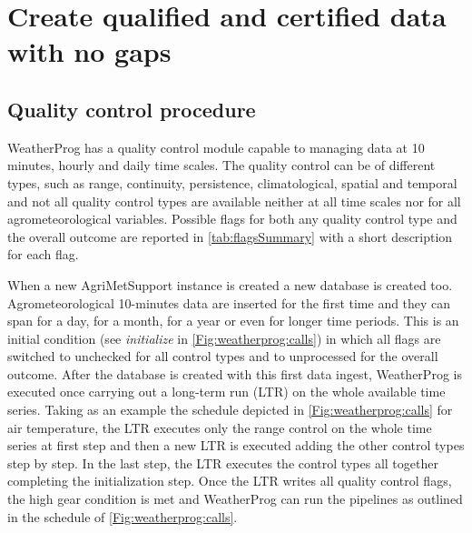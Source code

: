 \documentclass[authoryear,preprint,review,12pt]{elsarticle}
\newcommand{\note}[1]{\emph{\textcolor{red}{#1}}}
\begin{document}
\section{Create qualified and certified data with no gaps} \label{sec:qck+fill}

\subsection{Quality control procedure} \label{sec:qcheck}
WeatherProg has a quality control module capable to managing data at 10 minutes, hourly and daily time scales.
The quality control can be of different types, such as range, continuity, persistence, climatological, spatial and temporal and not all quality control types are available neither at all time scales nor for all agrometeorological variables.
Possible flags for both any quality control type and the overall outcome are reported in \cref{tab:flagsSummary} with a short description for each flag.

When a new AgriMetSupport instance is created a new database is created too.
Agrometeorological 10-minutes data are inserted for the first time and they can span for a day, for a month, for a year or even for longer time periods.
This is an initial condition (see \textit{initialize} in \cref{Fig:weatherprog:calls}) in which all flags are switched to unchecked for all control types and to unprocessed for the overall outcome.
After the database is created with this first data ingest, WeatherProg is executed once carrying out a long-term run (LTR) on the whole available time series.
Taking as an example the schedule depicted in \cref{Fig:weatherprog:calls} for air temperature, the LTR executes only the range control on the whole time series at first step and then a new LTR is executed adding the other control types step by step.
In the last step, the LTR executes the control types all together completing the initialization step.
Once the LTR writes all quality control flags, the high gear condition is met and WeatherProg can run the pipelines as outlined in the schedule of \cref{Fig:weatherprog:calls}.
\end{document}
